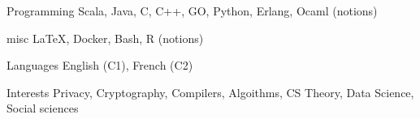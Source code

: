 


\begin{cvskills}


\cvskill
{Programming} %
{Scala, Java, C, C++, GO, Python, Erlang, Ocaml (notions)} %


\cvskill
{misc} %
{\LaTeX, Docker, Bash, R (notions)} %


\cvskill
{Languages} %
{English (C1), French (C2)} %


\cvskill
{Interests} %
{Privacy, Cryptography, Compilers, Algoithms, CS Theory, Data Science, Social sciences} %


\end{cvskills}